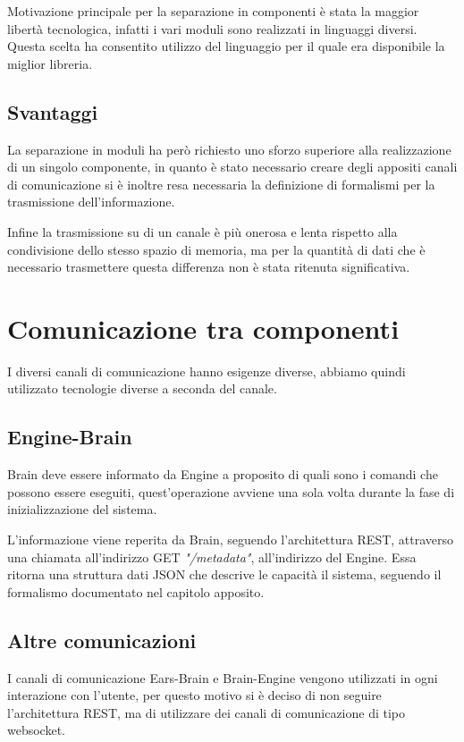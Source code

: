 \documentclass[twoside]{supsistudent}
\begin{document}
Motivazione principale per la separazione in componenti è stata la maggior libertà tecnologica, infatti i vari moduli sono realizzati in linguaggi diversi. 
Questa scelta ha consentito utilizzo del linguaggio per il quale era disponibile la miglior libreria.

\section{Svantaggi}

La separazione in moduli ha però richiesto uno sforzo superiore alla realizzazione di un singolo componente, in quanto è stato necessario creare degli appositi canali di comunicazione si è inoltre resa necessaria la definizione di formalismi per la trasmissione dell'informazione.

Infine la trasmissione su di un canale è più onerosa e lenta rispetto alla condivisione dello stesso spazio di memoria, ma per la quantità di dati che è necessario trasmettere questa differenza non è stata ritenuta significativa.

\chapter{Comunicazione tra componenti}
I diversi canali di comunicazione hanno esigenze diverse, abbiamo quindi utilizzato tecnologie diverse a seconda del canale.

\section{Engine-Brain}
Brain deve essere informato da Engine a proposito di quali sono i comandi che possono essere eseguiti, quest'operazione avviene una sola volta durante la fase di inizializzazione del sistema.

L'informazione viene reperita da Brain, seguendo l'architettura REST, attraverso una chiamata all'indirizzo GET \textit{"/metadata"}, all'indirizzo del Engine. Essa ritorna una struttura dati JSON che descrive le capacità il sistema, seguendo il formalismo documentato nel capitolo apposito.
\section{Altre comunicazioni}
I canali di comunicazione Ears-Brain e Brain-Engine vengono utilizzati in ogni interazione con l'utente, per questo motivo si è deciso di non seguire l'architettura REST, ma di utilizzare dei canali di comunicazione di tipo websocket.
\end{document}
